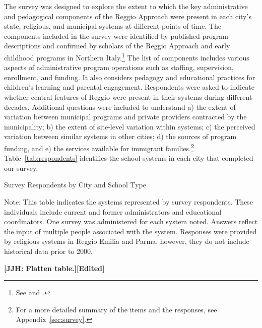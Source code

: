 The survey was designed to explore the extent to which the key administrative and pedagogical components of the Reggio Approach were present in each city's state, religious, and municipal systems at different points of time. The components included in the survey were identified by published program descriptions and confirmed by scholars of the Reggio Approach and early childhood programs in Northern Italy.\footnote{See \citet{Edwards-etal-eds_1998_Hundred-Languages} and \citet{Corsaro_2008_Policy-Practice}.} The list of components includes various aspects of administrative program operations such as staffing, supervision, enrollment, and funding. It also considers pedagogy and educational practices for children's learning and parental engagement. Respondents were asked to indicate whether central features of Reggio were present in their systems during different decades. Additional questions were included to understand a) the extent of variation between municipal programs and private providers contracted by the municipality; b) the extent of site-level variation within systems; c) the perceived variation between similar systems in other cities; d) the sources of program funding, and e) the services available for immigrant families.\footnote{For a more detailed summary of the items and the responses, see Appendix~\ref{sec:survey}.} Table~\ref{tab:respondents} identifies the school systems in each city that completed our survey.

\begin{table}[H]
\centering
\caption{Survey Respondents by City and School Type}\label{tab:respondents}
\begin{threeparttable}
	
\begin{tablenotes}
\footnotesize Note: This table indicates the systems represented by survey respondents. These individuals include current and former administrators and educational coordinators. One survey was administered for each system noted. Answers reflect the input of multiple people associated with the system. Responses were provided by religious systems in Reggio Emilia and Parma, however, they do not include historical data prior to 2000.
\end{tablenotes}
\end{threeparttable}
\end{table}

\textbf{[JJH: Flatten table.][Edited]}

